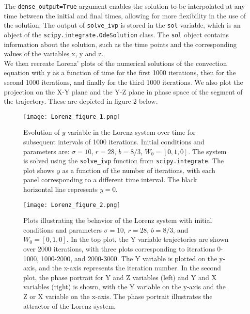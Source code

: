 \documentclass[letterpaper,10.9pt]{article}
\begin{document}
The \texttt{dense\_output=True} argument enables the solution to be interpolated at any time between the initial and final times, allowing for more flexibility in the use of the solution. The output of \texttt{solve\_ivp} is stored in the \texttt{sol} variable, which is an object of the \texttt{scipy.integrate.OdeSolution} class. The \texttt{sol} object contains information about the solution, such as the time points and the corresponding values of the variables x, y and z.\\

We then recreate Lorenz' plots of the numerical solutions of the convection equation with y as a function of time for the first 1000 iterations, then for the second 1000 iterations, and finally for the third 1000 iterations. We also plot the projection on the X-Y plane and the Y-Z plane in phase space of the segment of the trajectory. These are depicted in figure 2 below.\\

\begin{figure}[H]
  \centering
  \texttt{[image: Lorenz\_figure\_1.png]}
  \caption{Evolution of $y$ variable in the Lorenz system over time for subsequent intervals of 1000 iterations. Initial conditions and parameters are: $\sigma=10$, $r=28$, $b=8/3$, $W_0=[0,1,0]$. The system is solved using the \texttt{solve\_ivp} function from \texttt{scipy.integrate}. The plot shows $y$ as a function of the number of iterations, with each panel corresponding to a different time interval. The black horizontal line represents $y=0$.}
  \label{fig:label}
\end{figure}

\begin{figure}[H]
  \centering
  \texttt{[image: Lorenz\_figure\_2.png]}
  \caption{Plots illustrating the behavior of the Lorenz system with initial conditions and parameters $\sigma=10$, $r=28$, $b=8/3$, and $W_0=[0,1,0]$. In the top plot, the Y variable trajectories are shown over 2000 iterations, with three plots corresponding to iterations 0-1000, 1000-2000, and 2000-3000. The Y variable is plotted on the y-axis, and the x-axis represents the iteration number. In the second plot, the phase portrait for Y and Z variables (left) and Y and X variables (right) is shown, with the Y variable on the y-axis and the Z or X variable on the x-axis. The phase portrait illustrates the attractor of the Lorenz system.}
  \label{fig:label}
\end{figure}
\end{document}
